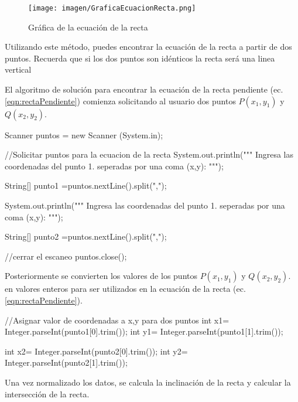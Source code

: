 \documentclass{IEEEcsmag}
\begin{document}
\begin{figure}[h!]
    \centering
    \texttt{[image: imagen/GraficaEcuacionRecta.png]}
    \caption{Gráfica de la ecuación de la recta}
    \label{fig:GraficaEcuacionRecta}
\end{figure}

Utilizando este método, puedes encontrar la ecuación de la recta a partir de dos puntos. Recuerda que si los dos puntos son idénticos la recta será una linea vertical \cite{rectaPendiente}

El algoritmo de solución para encontrar la ecuación de la recta pendiente  (ec. \ref{eqn:rectaPendiente}) comienza solicitando al usuario dos puntos $P(x_{1}, y_{1})$ y $Q(x_{2}, y_{2})$.

\begin{javaCode}

Scanner puntos = new Scanner (System.in);
        
    //Solicitar puntos para la ecuacion de la recta  
    System.out.println("""
                        Ingresa las coordenadas del punto 1.
                        seperadas por una coma (x,y):
                           """);
    
    String[] punto1 =puntos.nextLine().split(",");
        
    System.out.println("""
                        Ingresa las coordenadas del punto 1.
                        seperadas por una coma (x,y):
                        """);
    
    String[] punto2 =puntos.nextLine().split(",");
        
    //cerrar el escaneo
    puntos.close();
        
\end{javaCode}

Posteriormente se convierten los valores de los puntos $P(x_{1}, y_{1})$ y $Q(x_{2}, y_{2})$. en valores enteros para ser utilizados  en la ecuación de la recta (ec. \ref{eqn:rectaPendiente}).

\begin{javaCode}
    //Asignar valor de coordenadas a x,y para dos puntos
    int x1= Integer.parseInt(punto1[0].trim());
    int y1= Integer.parseInt(punto1[1].trim());
       
    int x2= Integer.parseInt(punto2[0].trim());
    int y2= Integer.parseInt(punto2[1].trim());
\end{javaCode}

Una vez normalizado los datos, se calcula la inclinación de la recta y calcular la intersección de la recta.
\end{document}
